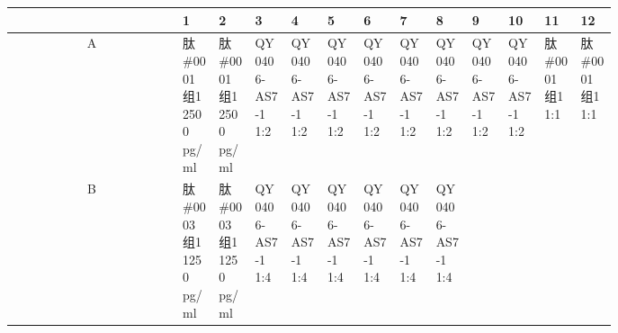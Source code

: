 \documentclass[UTF8,10pt,a4paper,fontset=fandol]{ctexart}
\begin{document}
\medskip
\begin{center}
\scriptsize
\setlength{\tabcolsep}{2pt}
\begin{tabular}{c|*{12}{p{0.065\linewidth}|}}
 & 1 & 2 & 3 & 4 & 5 & 6 & 7 & 8 & 9 & 10 & 11 & 12\\ \hline
A&
\shortstack{肽\#0001\\组1\\2500 pg/ml}&
\shortstack{肽\#0001\\组1\\2500 pg/ml}&
\shortstack{QY0406-\\AS7-1\\1:2}&
\shortstack{QY0406-\\AS7-1\\1:2}&
\shortstack{QY0406-\\AS7-1\\1:2}&
\shortstack{QY0406-\\AS7-1\\1:2}&
\shortstack{QY0406-\\AS7-1\\1:2}&
\shortstack{QY0406-\\AS7-1\\1:2}&
\shortstack{QY0406-\\AS7-1\\1:2}&
\shortstack{QY0406-\\AS7-1\\1:2}&
\shortstack{肽\#0001\\组1\\1:1}&
\shortstack{肽\#0001\\组1\\1:1}\\ \hline
B&
\shortstack{肽\#0003\\组1\\1250 pg/ml}&
\shortstack{肽\#0003\\组1\\1250 pg/ml}&
\shortstack{QY0406-\\AS7-1\\1:4}&
\shortstack{QY0406-\\AS7-1\\1:4}&
\shortstack{QY0406-\\AS7-1\\1:4}&
\shortstack{QY0406-\\AS7-1\\1:4}&
\shortstack{QY0406-\\AS7-1\\1:4}&
\shortstack{QY0406-\\AS7-1\\1:4}&

\end{tabular}
\end{center}
\end{document}
